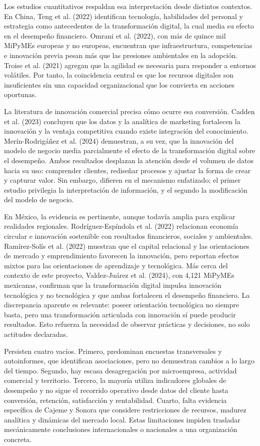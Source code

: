 \documentclass[spanish,letterpaper,oneside]{article}
\begin{document}
Los estudios cuantitativos respaldan esa interpretación desde distintos contextos. En China, Teng et al. (2022) identifican tecnología, habilidades del personal y estrategia como antecedentes de la transformación digital, la cual media su efecto en el desempeño financiero. Omrani et al. (2022), con más de quince mil MiPyMEs europeas y no europeas, encuentran que infraestructura, competencias e innovación previa pesan más que las presiones ambientales en la adopción. Troise et al. (2021) agregan que la agilidad es necesaria para responder a entornos volátiles. Por tanto, la coincidencia central es que los recursos digitales son insuficientes sin una capacidad organizacional que los convierta en acciones oportunas.

La literatura de innovación comercial precisa cómo ocurre esa conversión. Cadden et al. (2023) concluyen que los datos y la analítica de marketing fortalecen la innovación y la ventaja competitiva cuando existe integración del conocimiento. Merín-Rodrigáñez et al. (2024) demuestran, a su vez, que la innovación del modelo de negocio media parcialmente el efecto de la transformación digital sobre el desempeño. Ambos resultados desplazan la atención desde el volumen de datos hacia su uso: comprender clientes, rediseñar procesos y ajustar la forma de crear y capturar valor. Sin embargo, difieren en el mecanismo enfatizado; el primer estudio privilegia la interpretación de información, y el segundo la modificación del modelo de negocio.

En México, la evidencia es pertinente, aunque todavía amplia para explicar realidades regionales. Rodríguez-Espíndola et al. (2022) relacionan economía circular e innovación sostenible con resultados financieros, sociales y ambientales. Ramírez-Solís et al. (2022) muestran que el capital relacional y las orientaciones de mercado y emprendimiento favorecen la innovación, pero reportan efectos mixtos para las orientaciones de aprendizaje y tecnológica. Más cerca del contexto de este proyecto, Valdez-Juárez et al. (2024), con 4,121 MiPyMEs mexicanas, confirman que la transformación digital impulsa innovación tecnológica y no tecnológica y que ambas fortalecen el desempeño financiero. La discrepancia aparente es relevante: poseer orientación tecnológica no siempre basta, pero una transformación articulada con innovación sí puede producir resultados. Esto refuerza la necesidad de observar prácticas y decisiones, no solo actitudes declaradas.

Persisten cuatro vacíos. Primero, predominan encuestas transversales y autoinformes, que identifican asociaciones, pero no demuestran cambios a lo largo del tiempo. Segundo, hay escasa desagregación por microempresa, actividad comercial y territorio. Tercero, la mayoría utiliza indicadores globales de desempeño y no sigue el recorrido operativo desde datos del cliente hasta conversión, retención, satisfacción y rentabilidad. Cuarto, falta evidencia específica de Cajeme y Sonora que considere restricciones de recursos, madurez analítica y dinámicas del mercado local. Estas limitaciones impiden trasladar mecánicamente conclusiones internacionales o nacionales a una organización concreta.
\end{document}
